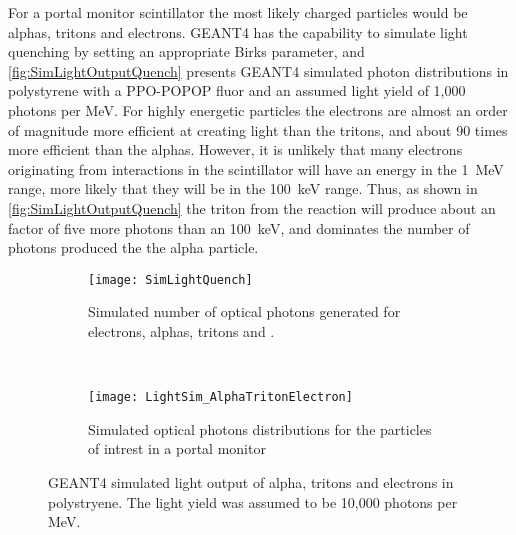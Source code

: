For a portal monitor scintillator the most likely charged particles would be alphas, tritons and electrons.
GEANT4 has the capability to simulate light quenching by setting an appropriate Birks parameter, and \autoref{fig:SimLightOutputQuench} presents GEANT4 simulated photon distributions in polystyrene with a PPO-POPOP fluor and an assumed light yield of 1,000 photons per MeV.
For highly energetic particles the electrons are almost an order of magnitude more efficient at creating light than the tritons, and about 90 times more efficient than the alphas.
However, it is unlikely that many electrons originating from  interactions in the scintillator will have an energy in the \SI{1}{\MeV} range, more likely that they will be in the \SI{100}{\keV} range.
Thus, as shown in \autoref{fig:SimLightOutputQuench} the triton from the  reaction will produce about an factor of five more photons than an \SI{100}{\keV}, and dominates the number of photons produced the the alpha particle.
\begin{figure}
  \centering
    \begin{subfigure}[b]{0.49\textwidth}
    \texttt{[image: SimLightQuench]}
    \caption{Simulated number of optical photons generated for electrons, alphas, tritons and .}
  \end{subfigure}%
  ~
  \begin{subfigure}[b]{0.49\textwidth}
    \texttt{[image: LightSim\_AlphaTritonElectron]}
    \caption{Simulated optical photons distributions for the particles of intrest in a portal monitor}
  \end{subfigure}
  \caption[Simulated Light Output of Alphas, Tritons, and Electrons]{GEANT4 simulated light output of alpha, tritons and electrons in polystryene. The light yield was assumed to be 10,000 photons per MeV.}
  \label{fig:SimLightOutputQuench}
\end{figure}

